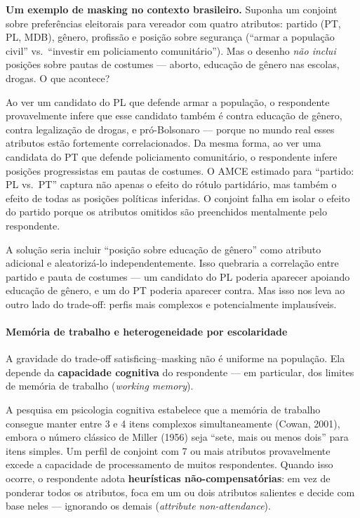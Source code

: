 \documentclass[
]{article}
\begin{document}
\textbf{Um exemplo de masking no contexto brasileiro.} Suponha um conjoint sobre preferências eleitorais para vereador com quatro atributos: partido (PT, PL, MDB), gênero, profissão e posição sobre segurança (``armar a população civil'' vs.~``investir em policiamento comunitário''). Mas o desenho \emph{não inclui} posições sobre pautas de costumes --- aborto, educação de gênero nas escolas, drogas. O que acontece?

Ao ver um candidato do PL que defende armar a população, o respondente provavelmente infere que esse candidato também é contra educação de gênero, contra legalização de drogas, e pró-Bolsonaro --- porque no mundo real esses atributos estão fortemente correlacionados. Da mesma forma, ao ver uma candidata do PT que defende policiamento comunitário, o respondente infere posições progressistas em pautas de costumes. O AMCE estimado para ``partido: PL vs.~PT'' captura não apenas o efeito do rótulo partidário, mas também o efeito de todas as posições políticas inferidas. O conjoint falha em isolar o efeito do partido porque os atributos omitidos são preenchidos mentalmente pelo respondente.

A solução seria incluir ``posição sobre educação de gênero'' como atributo adicional e aleatorizá-lo independentemente. Isso quebraria a correlação entre partido e pauta de costumes --- um candidato do PL poderia aparecer apoiando educação de gênero, e um do PT poderia aparecer contra. Mas isso nos leva ao outro lado do trade-off: perfis mais complexos e potencialmente implausíveis.

\paragraph{Memória de trabalho e heterogeneidade por escolaridade}\label{memuxf3ria-de-trabalho-e-heterogeneidade-por-escolaridade}

A gravidade do trade-off satisficing--masking não é uniforme na população. Ela depende da \textbf{capacidade cognitiva} do respondente --- em particular, dos limites de memória de trabalho (\emph{working memory}).

A pesquisa em psicologia cognitiva estabelece que a memória de trabalho consegue manter entre 3 e 4 itens complexos simultaneamente (Cowan, 2001), embora o número clássico de Miller (1956) seja ``sete, mais ou menos dois'' para itens simples. Um perfil de conjoint com 7 ou mais atributos provavelmente excede a capacidade de processamento de muitos respondentes. Quando isso ocorre, o respondente adota \textbf{heurísticas não-compensatórias}: em vez de ponderar todos os atributos, foca em um ou dois atributos salientes e decide com base neles --- ignorando os demais (\emph{attribute non-attendance}).
\end{document}
